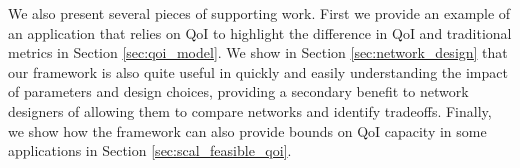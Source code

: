 We also present several pieces of supporting work.  First we provide an example of an application that relies on QoI to highlight the difference in QoI and traditional metrics in Section \ref{sec:qoi_model}.  We show in Section \ref{sec:network_design} that our framework is also quite useful in quickly and easily understanding the impact of parameters and design choices, providing a secondary benefit to network designers of allowing them to compare networks and identify tradeoffs.  Finally, we show how the framework can also provide bounds on QoI capacity in some applications in Section \ref{sec:scal_feasible_qoi}.






